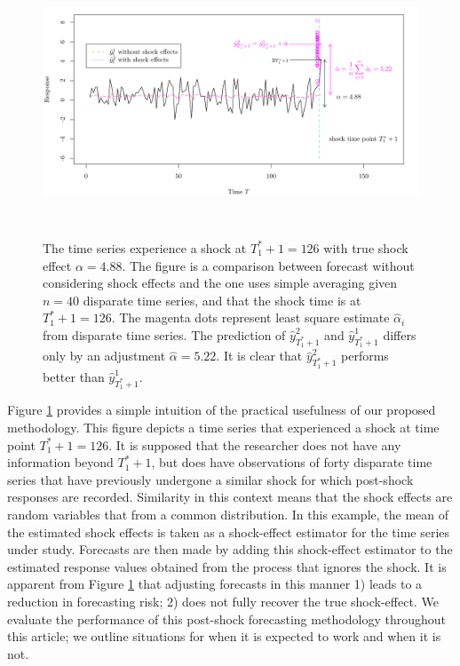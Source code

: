 \documentclass[11pt]{article}
\theoremstyle{definition}
\begin{document}
\begin{figure}
  \begin{center}
    \includegraphics[height = 8cm]{comp.pdf}
    \caption{The time series experience a shock at $T_1^*+1=126$ with true shock effect $\alpha = 4.88$. The figure is a comparison between forecast without considering shock effects and the one uses simple averaging given $n=40$ disparate time series, and that the shock time is at $T_1^* +1=126$. The magenta dots represent least square estimate $\hat{\alpha}_i$ from disparate time series. The prediction of $\hat{y}^{2}_{T_1^*+1}$ and $\hat{y}^{1}_{T_1^*+1}$ differs only by an adjustment $\hat{\alpha}=5.22$. It is clear that $\hat{y}^{2}_{T_1^*+1}$ performs better than $\hat{y}^{1}_{T_1^*+1}$.}\label{figure1}
  \end{center}  
  \vspace{-.6cm}
\end{figure}

Figure \ref{figure1} provides a simple intuition of the practical usefulness of our proposed methodology. This figure depicts a time series that experienced a shock at time point $T_1^*+1 = 126$. It is supposed that the researcher does not have any information beyond $T_1^*+1$, but does have observations of forty disparate time series that have previously undergone a similar shock for which post-shock responses are recorded. Similarity in this context means that the shock effects are random variables that from a common distribution.
In this example, the mean of the estimated shock effects is taken as a shock-effect estimator for the time series under study. Forecasts are then made by adding this shock-effect estimator to the estimated response values obtained from the process that ignores the shock. It is apparent from Figure \ref{figure1} that adjusting forecasts in this manner 1) leads to a reduction in forecasting risk; 2) does not fully recover the true shock-effect. We evaluate the performance of this post-shock forecasting methodology throughout this article; we outline situations for when it is expected to work and when it is not.
\end{document}
